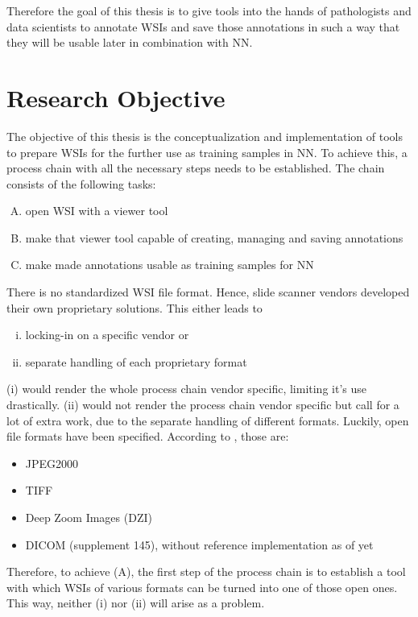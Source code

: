 Therefore the goal of this thesis is to give tools into the hands of pathologists and data scientists to annotate WSIs and save those annotations in such a way that they will be usable later in combination with NN.


\section{Research Objective}
The objective of this thesis is the conceptualization and implementation of tools to prepare WSIs for the further use as training samples in NN. To achieve this, a process chain with all the necessary steps needs to be established. The chain consists of the following tasks:
\begin{enumerate}[(A)]
	\item open WSI with a viewer tool
	\item make that viewer tool capable of creating, managing and saving annotations
	\item make made annotations usable as training samples for NN
\end{enumerate}

There is no standardized WSI file format\cite{Cornish13}. Hence, slide scanner vendors developed their own proprietary solutions. This either leads to
\begin{enumerate}[(i)]
	\item locking-in on a specific vendor or
	\item separate handling of each proprietary format
\end{enumerate}
(i) would render the whole process chain vendor specific, limiting it's use drastically. (ii) would not render the process chain vendor specific but call for a lot of extra work, due to the separate handling of different formats. Luckily, open file formats have been specified. According to \cite{Cornish13}, those are:
\begin{itemize}
	\item JPEG2000
	\item TIFF
	\item Deep Zoom Images (DZI)
	\item DICOM (supplement 145), without reference implementation as of yet\cite{Cornish13}
\end{itemize}
Therefore, to achieve (A), the first step of the process chain is to establish a tool with which WSIs of various formats can be turned into one of those open ones. This way, neither (i) nor (ii) will arise as a problem.

